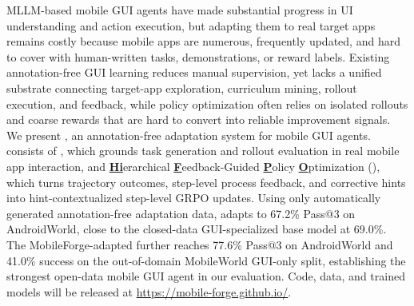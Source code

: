 MLLM-based mobile GUI agents have made substantial progress in UI understanding and action execution, but adapting them to real target apps remains costly because mobile apps are numerous, frequently updated, and hard to cover with human-written tasks, demonstrations, or reward labels. Existing annotation-free GUI learning reduces manual supervision, yet lacks a unified substrate connecting target-app exploration, curriculum mining, rollout execution, and feedback, while policy optimization often relies on isolated rollouts and coarse rewards that are hard to convert into reliable improvement signals. We present \textbf{\ourmethod}, an annotation-free adaptation system for mobile GUI agents. \ourmethod consists of \textbf{\mobilegym}, which grounds task generation and rollout evaluation in real mobile app interaction, and \textbf{\underline{Hi}}erarchical \textbf{\underline{F}}eedback-Guided \textbf{\underline{P}}olicy \textbf{\underline{O}}ptimization (\textbf{\hifpo}), which turns trajectory outcomes, step-level process feedback, and corrective hints into hint-contextualized step-level GRPO updates. Using only automatically generated annotation-free adaptation data, \ourmethod adapts  to 67.2\% Pass@3 on AndroidWorld, close to the closed-data GUI-specialized  base model at 69.0\%. The MobileForge-adapted  further reaches 77.6\% Pass@3 on AndroidWorld and 41.0\% success on the out-of-domain MobileWorld GUI-only split, establishing the strongest open-data mobile GUI agent in our evaluation. Code, data, and trained models will be released at \url{https://mobile-forge.github.io/}.
